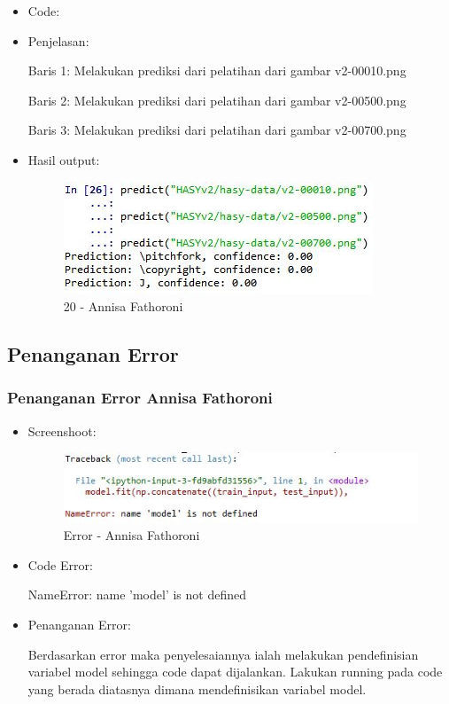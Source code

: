 \begin{itemize}
\item Code:


\item Penjelasan:

Baris 1: Melakukan prediksi dari pelatihan dari gambar v2-00010.png

Baris 2: Melakukan prediksi dari pelatihan dari gambar v2-00500.png

Baris 3: Melakukan prediksi dari pelatihan dari gambar v2-00700.png

\item Hasil output:

\begin{figure}[!hbtp]
\centering
\includegraphics[scale=0.7]{figures/Chapter 7/1164067/Praktek/Chapter7AnnisaFathoroni20.jpg}
\caption{20 - Annisa Fathoroni}
\label{20 - Annisa Fathoroni}
\end{figure}

\end{itemize}


\subsection{Penanganan Error}

\subsubsection{Penanganan Error Annisa Fathoroni}

\begin{itemize}
\item Screenshoot:
\begin{figure}[!hbtp]
\centering
\includegraphics[scale=0.7]{figures/Chapter 7/1164067/Praktek/Chapter7AnnisaFathoroniError.jpeg}
\caption{Error - Annisa Fathoroni}
\label{Error - Annisa Fathoroni}
\end{figure}

\item Code Error:

NameError: name 'model' is not defined

\item Penanganan Error:

Berdasarkan error maka penyelesaiannya ialah melakukan pendefinisian variabel model sehingga code dapat dijalankan. Lakukan running pada code yang berada diatasnya dimana mendefinisikan variabel model.

\end{itemize}
